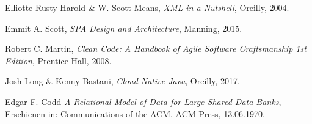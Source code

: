 \begin{thebibliography}{9}

  Elliotte Rusty Harold \& W. Scott Means,
  \textit{XML in a Nutshell},
  Oreilly,
  2004.

  Emmit A. Scott,
  \textit{SPA Design and Architecture},
  Manning,
  2015.

  Robert C. Martin,
  \textit{Clean Code: A Handbook of Agile Software Craftsmanship 1st Edition},
  Prentice Hall,
  2008.

  Josh Long \& Kenny Bastani,
  \textit{Cloud Native Java},
  Oreilly,
  2017.

  Edgar F. Codd
  \textit{A Relational Model of Data for Large Shared Data Banks},
  Erschienen in: Communications of the ACM,
  ACM Press,
  13.06.1970.
\end{thebibliography}
